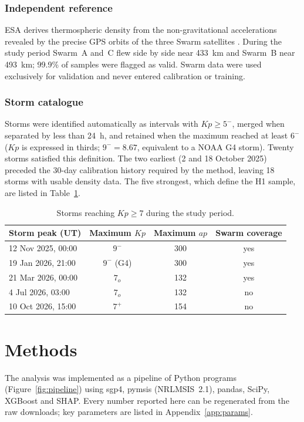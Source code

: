 \documentclass[11pt]{article}
\newcommand{\Kp}{\mathit{Kp}}
\newcommand{\ap}{\mathit{ap}}
\begin{document}
\subsubsection{Independent reference}
ESA derives thermospheric density from the non-gravitational accelerations revealed by the precise GPS orbits of the three Swarm satellites \citep{vandenijssel2020}. During the study period Swarm~A and~C flew side by side near 433~km and Swarm~B near 493~km; 99.9\% of samples were flagged as valid. Swarm data were used exclusively for validation and never entered calibration or training.

\subsubsection{Storm catalogue}
Storms were identified automatically as intervals with $\Kp \geq 5^-$, merged when separated by less than 24~h, and retained when the maximum reached at least $6^-$ ($\Kp$ is expressed in thirds; $9^- = 8.67$, equivalent to a NOAA G4 storm). Twenty storms satisfied this definition. The two earliest (2 and 18 October 2025) preceded the 30-day calibration history required by the method, leaving 18 storms with usable density data. The five strongest, which define the H1 sample, are listed in Table~\ref{tab:storms}.

\begin{table}[!htbp]
\centering\small
\caption{Storms reaching $\Kp \geq 7$ during the study period.}\label{tab:storms}
\begin{tabular}{@{}lccc@{}}
\toprule
Storm peak (UT) & Maximum $\Kp$ & Maximum $\ap$ & Swarm coverage \\
\midrule
12 Nov 2025, 00:00 & $9^-$ & 300 & yes \\
19 Jan 2026, 21:00 & $9^-$ (G4) & 300 & yes \\
21 Mar 2026, 00:00 & $7_o$ & 132 & yes \\
4 Jul 2026, 03:00 & $7_o$ & 132 & no \\
10 Oct 2026, 15:00 & $7^+$ & 154 & no \\
\bottomrule
\end{tabular}
\end{table}

\section{Methods}

The analysis was implemented as a pipeline of Python programs (Figure~\ref{fig:pipeline}) using sgp4, pymsis (NRLMSIS~2.1), pandas, SciPy, XGBoost and SHAP. Every number reported here can be regenerated from the raw downloads; key parameters are listed in Appendix~\ref{app:params}.
\end{document}
